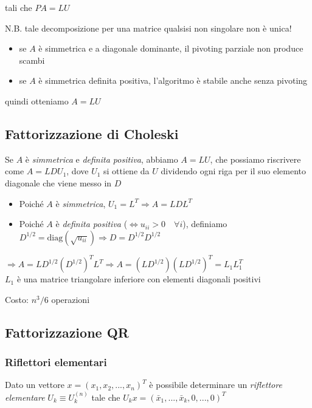 \documentclass[openany]{book}
\begin{document}
tali che $PA=LU $

N.B. tale decomposizione per una matrice qualsisi non singolare non è unica!

\begin{itemize}
	\item se $A$ è simmetrica e a diagonale dominante, il pivoting parziale non produce scambi
	\item se $ A$ è simmetrica definita positiva, l'algoritmo è stabile anche senza pivoting
\end{itemize}

quindi otteniamo $A=LU$

\subsection {Fattorizzazione di Choleski}

Se $A$ è \textit{simmetrica} e \textit{definita positiva}, abbiamo $A=LU$, che possiamo riscrivere come $A=LDU_1$, dove $U_1$ si ottiene da $U$ dividendo ogni riga per il suo elemento diagonale che viene messo in $D$

\begin{itemize}
	\item Poiché $A$ è \textit{simmetrica}, $U_1 = L^T \Rightarrow A=LDL^T$ 
	\item Poiché $A$ è \textit{definita positiva} ($\Leftrightarrow u_{ii}>0 \quad \forall i$), definiamo $D^{1/2}=\text {diag}(\sqrt {u_{ii}})\Rightarrow D=D^{1/2}D^{1/2}$

\end{itemize}

$\Rightarrow A=LD^{1/2}(D^{1/2})^T L^T\Rightarrow A=(LD^{1/2})(LD^{1/2})^T=L_1L_1^T$
\\

$L_1$ è una matrice triangolare inferiore con elementi diagonali positivi

Costo: $n^3/6$ operazioni

\subsection {Fattorizzazione QR}

\subsubsection {Riflettori elementari}

Dato un vettore $x=(x_1,x_2,...,x_n)^T$ è possibile determinare un \textit{riflettore elementare} $U_k \equiv U_k^{(n)}$ tale che $U_kx=(\bar{x}_1,...,\bar{x}_k,0,...,0)^T$
\\
\end{document}
